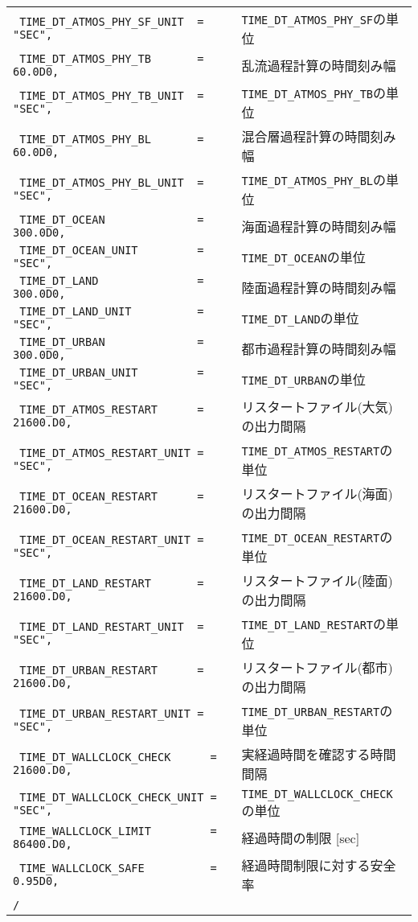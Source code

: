 {{{\begin{tabularx}{150mm}{lX}
\verb| TIME_DT_ATMOS_PHY_SF_UNIT  = "SEC",  | & \verb|TIME_DT_ATMOS_PHY_SF|の単位\\
\verb| TIME_DT_ATMOS_PHY_TB       = 60.0D0,| & 乱流過程計算の時間刻み幅 \\
\verb| TIME_DT_ATMOS_PHY_TB_UNIT  = "SEC", | & \verb|TIME_DT_ATMOS_PHY_TB|の単位\\
\verb| TIME_DT_ATMOS_PHY_BL       = 60.0D0,| & 混合層過程計算の時間刻み幅 \\
\verb| TIME_DT_ATMOS_PHY_BL_UNIT  = "SEC", | & \verb|TIME_DT_ATMOS_PHY_BL|の単位\\
\verb| TIME_DT_OCEAN              = 300.0D0,| & 海面過程計算の時間刻み幅\\
\verb| TIME_DT_OCEAN_UNIT         = "SEC",  | & \verb|TIME_DT_OCEAN|の単位\\
\verb| TIME_DT_LAND               = 300.0D0,| & 陸面過程計算の時間刻み幅\\
\verb| TIME_DT_LAND_UNIT          = "SEC",  | & \verb|TIME_DT_LAND|の単位\\
\verb| TIME_DT_URBAN              = 300.0D0,| & 都市過程計算の時間刻み幅\\
\verb| TIME_DT_URBAN_UNIT         = "SEC",  | & \verb|TIME_DT_URBAN|の単位\\
\verb| TIME_DT_ATMOS_RESTART      = 21600.D0, | & リスタートファイル(大気)の出力間隔\\
\verb| TIME_DT_ATMOS_RESTART_UNIT = "SEC",    | & \verb|TIME_DT_ATMOS_RESTART|の単位\\
\verb| TIME_DT_OCEAN_RESTART      = 21600.D0, | & リスタートファイル(海面)の出力間隔\\
\verb| TIME_DT_OCEAN_RESTART_UNIT = "SEC",    | & \verb|TIME_DT_OCEAN_RESTART|の単位\\
\verb| TIME_DT_LAND_RESTART       = 21600.D0, | & リスタートファイル(陸面)の出力間隔\\
\verb| TIME_DT_LAND_RESTART_UNIT  = "SEC",    | & \verb|TIME_DT_LAND_RESTART|の単位\\
\verb| TIME_DT_URBAN_RESTART      = 21600.D0, | & リスタートファイル(都市)の出力間隔\\
\verb| TIME_DT_URBAN_RESTART_UNIT = "SEC",    | & \verb|TIME_DT_URBAN_RESTART|の単位\\
\verb| TIME_DT_WALLCLOCK_CHECK      = 21600.D0,            | & 実経過時間を確認する時間間隔\\
\verb| TIME_DT_WALLCLOCK_CHECK_UNIT = "SEC",               | & \verb|TIME_DT_WALLCLOCK_CHECK|の単位\\
\verb| TIME_WALLCLOCK_LIMIT         = 86400.D0,            | & 経過時間の制限 [sec]\\
\verb| TIME_WALLCLOCK_SAFE          = 0.95D0,              | & 経過時間制限に対する安全率 \\
\verb|/|\\
\end{tabularx}
}}}\\


